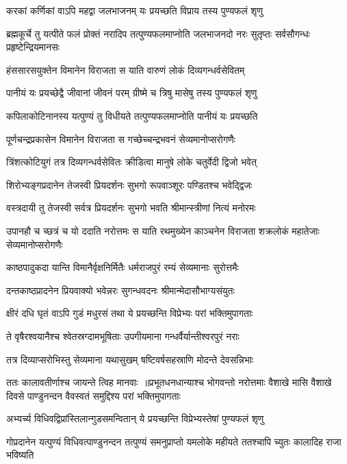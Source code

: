 \twolineshloka
{करकां कर्णिकां वाऽपि महद्वा जलभाजनम्}
{यः प्रयच्छति विप्राय तस्य पुण्यफलं शृणु}


\threelineshloka
{ब्रह्मकूर्चे तु यत्पीते फलं प्रोक्तं नरादिप}
{तत्पुण्यफलमाप्नोति जलभाजनदो नरः}
{सुतृप्तः सर्वसौगन्धः प्रहृष्टेन्द्रियमानसः}


\twolineshloka
{हंससारसयुक्तेन विमानेन विराजता}
{स याति वारुणं लोकं दिव्यगन्धर्वसेवितम्}


\twolineshloka
{पानीयं यः प्रयच्छेद्वै जीवानां जीवनं परम्}
{ग्रीष्मे च त्रिषु मासेषु तस्य पुण्यफलं शृणु}


\twolineshloka
{कपिलाकोटिनानस्य यत्पुण्यं तु विधीयते}
{तत्पुण्यफलमाप्नोति पानीयं यः प्रयच्छति}


\twolineshloka
{पूर्णचन्द्रप्रकासेन विमानेन विराजता}
{स गच्छेच्चन्द्रभवनं सेव्यमानोप्सरोगणैः}


\twolineshloka
{त्रिंशत्कोटियुगं तत्र दिव्यगन्धर्वसेवितः}
{क्रीडित्वा मानुषे लोके चतुर्वेदी द्विजो भवेत्}


\twolineshloka
{शिरोभ्यङ्गप्रदानेन तेजस्वी प्रियदर्शनः}
{सुभगो रूपवाञ्शूरः पण्डितश्च भवेद्द्विजः}


\twolineshloka
{वस्त्रदायी तु तेजस्वी सर्वत्र प्रियदर्शनः}
{सुभगो भवति श्रीमान्स्त्रीणां नित्यं मनोरमः}


\threelineshloka
{उपानहौ च च्छत्रं च यो ददाति नरोत्तमः}
{स याति रथमुख्येन काञ्चनेन विराजता}
{शक्रलोकं महातेजाः सेव्यमानोप्सरोगणैः}


\twolineshloka
{काष्ठपादुकदा यान्ति विमानैर्वृक्षनिर्मितैः}
{धर्मराजपुरं रम्यं सेव्यमानाः सुरोत्तमैः}


\twolineshloka
{दन्तकाष्ठप्रादनेन प्रियवाक्यो भवेन्नरः}
{सुगन्धवदनः श्रीमान्मेदासौभाग्यसंयुतः}


\twolineshloka
{क्षीरं दधि घृतं वाऽपि गुडं मधुरसं तथा}
{ये प्रयच्छन्ति विप्रेभ्यः परां भक्तिमुपागताः}


\twolineshloka
{ते वृषैरश्वयानैश्च श्वेतस्रग्दामभूषिताः}
{उपगीयमाना गन्धर्वैर्यान्तीश्वरपुरं नराः}


\twolineshloka
{तत्र दिव्याप्सरोभिस्तु सेव्यमाना यथासुखम्}
{षष्टिवर्षसहस्राणि मोदन्ते देवसन्निभाः}


ततः कालावतीर्णाश्च जायन्ते त्विह मानवाः ॥प्रभूतधनधान्याश्च भोगवन्तो नरोत्तमाः
\twolineshloka
{वैशाखे मासि वैशाखे दिवसे पाण्डुनन्दन}
{वैवस्वतं समुद्दिश्य परां भक्तिमुपागताः}


\twolineshloka
{अभ्यर्च्य विधिवद्विप्रांस्तिलान्गुडसमन्वितान्}
{ये प्रयच्छन्ति विप्रेभ्यस्तेषां पुण्यफलं शृणु}


\threelineshloka
{गोप्रदानेन यत्पुण्यं विधिवत्पाण्डुनन्दन}
{तत्पुण्यं समनुप्राप्तो यमलोके महीयते}
{ततश्चापि च्युतः कालादिह राजा भविष्यति}


